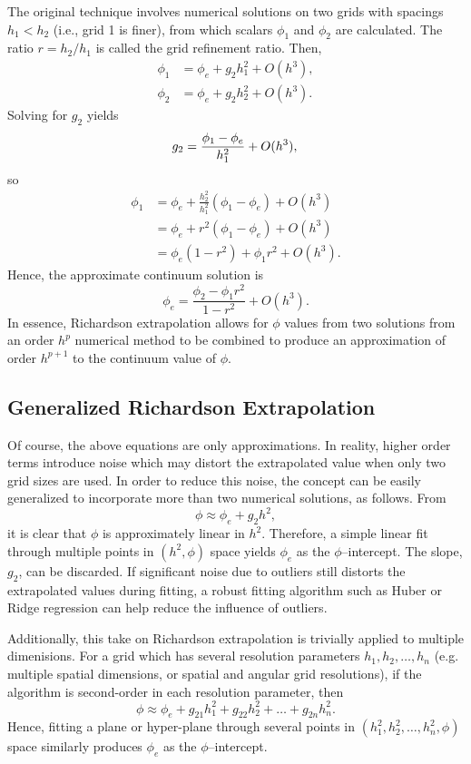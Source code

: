 The original technique involves numerical solutions on two grids with spacings $h_1 < h_2$ (i.e., grid 1 is finer), from which scalars $\phi_1$ and $\phi_2$ are calculated.
The ratio $r = h_2/h_1$ is called the grid refinement ratio.
Then,
\begin{align*}
  \phi_1 &= \phi_e + g_2 h_1^2 + O(h^3), \\
  \phi_2 &= \phi_e + g_2 h_2^2 + O(h^3).
\end{align*}
Solving for $g_2$ yields
\begin{equation*}
  g_2 = \frac{\phi_1 - \phi_e}{h_1^2} + O(h^3), \\
\end{equation*}
so
\begin{align*}
  \phi_1 &= \phi_e + \frac{h_2^2}{h_1^2}(\phi_1 - \phi_e) + O(h^3) \\
  &=  \phi_e + r^2(\phi_1 - \phi_e) + O(h^3) \\
  &= \phi_e(1-r^2) + \phi_1 r^2 + O(h^3).
\end{align*}
Hence, the approximate continuum solution is
\begin{equation*}
  \phi_e = \frac{\phi_2 - \phi_1 r^2}{1 - r^2} + O(h^3).
\end{equation*}
In essence, Richardson extrapolation allows for $\phi$ values from two solutions from an order $h^p$ numerical method to be combined to produce an approximation of order $h^{p+1}$ to the continuum value of $\phi$.

\subsection{Generalized Richardson Extrapolation}
\label{sec:generalized_re}
Of course, the above equations are only approximations.
In reality, higher order terms introduce noise which may distort the extrapolated value
when only two grid sizes are used.
In order to reduce this noise, the concept can be easily generalized to incorporate more than two numerical solutions, as follows.
From
\begin{equation*}
  \phi \approx \phi_e + g_2 h^2,
\end{equation*}
it is clear that $\phi$ is approximately linear in $h^2$.
Therefore, a simple linear fit through multiple points in $(h^2, \phi)$ space yields $\phi_e$ as the $\phi$--intercept.
The slope, $g_2$, can be discarded.
If significant noise due to outliers still distorts the extrapolated values during fitting, a robust fitting algorithm such as Huber \cite{yu_robust_2014} or Ridge \cite{hoerl_ridge_1970} regression can help reduce the influence of outliers.

Additionally, this take on Richardson extrapolation is trivially applied to multiple dimenisions.
For a grid which has several resolution parameters $h_1, h_2, \ldots, h_n$ (e.g. multiple spatial dimensions, or spatial and angular grid resolutions), if the algorithm is second-order in each resolution parameter, then
\begin{equation*}
  \phi \approx \phi_e + g_{21} h_1^2 + g_{22} h_2^2 + \ldots + g_{2n} h_n^2.
\end{equation*}
Hence, fitting a plane or hyper-plane through several points in $(h_1^2, h_2^2, \ldots, h_n^2, \phi)$ space similarly produces $\phi_e$ as the $\phi$--intercept.
